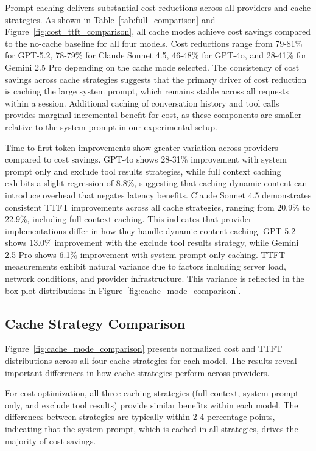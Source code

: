 \documentclass{article}
\theoremstyle{plain}
\theoremstyle{definition}
\theoremstyle{remark}
\begin{document}
Prompt caching delivers substantial cost reductions across all providers and cache strategies. As shown in Table~\ref{tab:full_comparison} and Figure~\ref{fig:cost_ttft_comparison}, all cache modes achieve cost savings compared to the no-cache baseline for all four models. Cost reductions range from 79-81\% for GPT-5.2, 78-79\% for Claude Sonnet 4.5, 46-48\% for GPT-4o, and 28-41\% for Gemini 2.5 Pro depending on the cache mode selected. The consistency of cost savings across cache strategies suggests that the primary driver of cost reduction is caching the large system prompt, which remains stable across all requests within a session. Additional caching of conversation history and tool calls provides marginal incremental benefit for cost, as these components are smaller relative to the system prompt in our experimental setup.

Time to first token improvements show greater variation across providers compared to cost savings. GPT-4o shows 28-31\% improvement with system prompt only and exclude tool results strategies, while full context caching exhibits a slight regression of 8.8\%, suggesting that caching dynamic content can introduce overhead that negates latency benefits. Claude Sonnet 4.5 demonstrates consistent TTFT improvements across all cache strategies, ranging from 20.9\% to 22.9\%, including full context caching. This indicates that provider implementations differ in how they handle dynamic content caching. GPT-5.2 shows 13.0\% improvement with the exclude tool results strategy, while Gemini 2.5 Pro shows 6.1\% improvement with system prompt only caching. TTFT measurements exhibit natural variance due to factors including server load, network conditions, and provider infrastructure. This variance is reflected in the box plot distributions in Figure~\ref{fig:cache_mode_comparison}.

\subsection{Cache Strategy Comparison}
\label{subsec:strategy_comparison}

Figure~\ref{fig:cache_mode_comparison} presents normalized cost and TTFT distributions across all four cache strategies for each model. The results reveal important differences in how cache strategies perform across providers.

For cost optimization, all three caching strategies (full context, system prompt only, and exclude tool results) provide similar benefits within each model. The differences between strategies are typically within 2-4 percentage points, indicating that the system prompt, which is cached in all strategies, drives the majority of cost savings.
\end{document}
